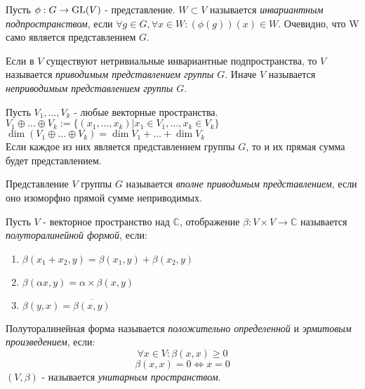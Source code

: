 \begin{defi}
Пусть $\phi:G\to\operatorname{GL}(V)$ - представление. $W\subset V$ называется \textit{инвариантным подпространством}, если $\forall g\in G,\forall x\in W: (\phi(g))(x)\in W$. Очевидно, что W само является представлением $G$.
\end{defi}

\begin{defi}
Если в $V$ существуют нетривиальные инвариантные подпространства, то $V$ называется \textit{приводимым представлением группы $G$}. Иначе $V$ называется \textit{неприводимым представлением группы $G$}.
\end{defi}

\begin{ass}
Пусть $V_1,\ldots,V_k$ - любые векторные пространства.\\
$V_1\oplus\ldots\oplus V_k:=\{(x_1,\ldots,x_k)|x_1\in V_1,\ldots,x_k\in V_k\}$\\
$\dim(V_1\oplus\ldots\oplus V_k) = \dim V_1+\ldots+\dim V_k$\\
Если каждое из них является представлением группы $G$, то и их прямая сумма будет представлением.
\end{ass}

\begin{defi}
Представление $V$ группы $G$ называется \textit{вполне приводимым представлением}, если оно изоморфно прямой сумме неприводимых.
\end{defi}

\begin{defi}
Пусть $V$ - векторное пространство над $\mathbb{C}$, отображение $\beta:V\times V\to \mathbb{C}$ называется \textit{полуторалинейной формой}, если:
\begin{enumerate}
  \item $\beta(x_1 + x_2,y) = \beta(x_1,y) + \beta(x_2,y)$
  \item $\beta(\alpha x,y) = \alpha\times\beta(x,y)$
  \item $\beta(y,x) = \overline{\beta(x,y)}$
\end{enumerate}
\end{defi}

\begin{defi}
Полуторалинейная форма называется \textit{положительно определенной} и \textit{эрмитовым произведением}, если:
$$\forall x\in V:\beta(x,x)\geq 0$$
$$\beta(x,x)=0\Leftrightarrow x=0$$
$(V,\beta)$ - называется \textit{унитарным пространством}.
\end{defi}

